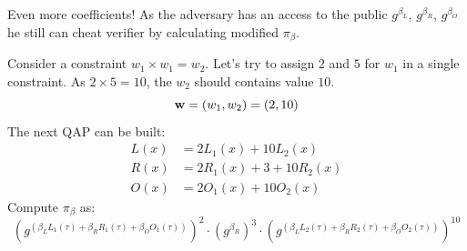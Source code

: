 \documentclass{zkdl-presentation-template}
\begin{document}
    \begin{frame}{Even more coefficients!}
        As the adversary has an access to the public $g^{\beta_L}$, $g^{\beta_R}$, $g^{\beta_O}$ he still can cheat verifier by calculating modified $\pi_{\beta}$.

        \begin{example}
            \small
            Consider a constraint $w_1 \times w_1 = w_2$. Let's try to assign $2$ and $5$ for $w_1$ in a single constraint. As $2 \times 5 = 10$, the $w_2$ should contains value $10$.
            \vspace{-5pt}
            \begin{equation*}
                \mathbf{w} = (w_1, w_2) = (2, 10)
                \vspace{-5pt}
            \end{equation*}
            \pause
            The next QAP can be built:
            \vspace{-5pt}
            \begin{align*}
                L(x) &= 2L_1(x) + 10L_2(x) \\
                R(x) &= 2R_1(x) + 3 + 10R_2(x) \\
                O(x) &= 2O_1(x) + 10O_2(x)
            \end{align*}
            \pause
            Compute $\pi_{\beta}$ as:
            \vspace{-5pt}
            \begin{equation*}
                (g^{\left( \beta_LL_1(\tau) + \beta_RR_1(\tau) + \beta_OO_1(\tau) \right)})^2 \cdot (g^{\beta_R})^3 \cdot (g^{\left( \beta_LL_2(\tau) + \beta_RR_2(\tau) + \beta_OO_2(\tau) \right)})^{10} 
            \end{equation*}
        \end{example}
    \end{frame}
\end{document}

